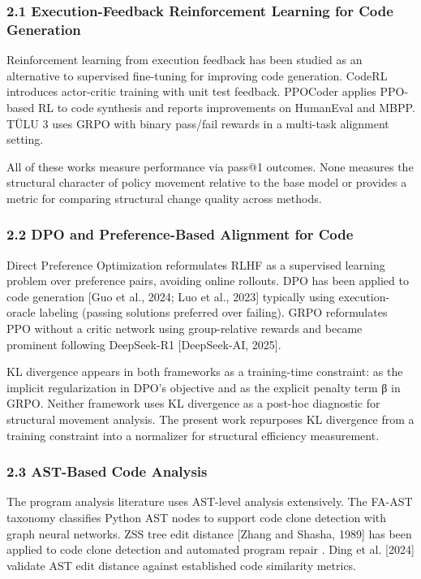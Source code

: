 
\subsubsection{2.1 Execution-Feedback Reinforcement Learning for Code Generation}

Reinforcement learning from execution feedback has been studied as an alternative to supervised fine-tuning for improving code generation. CodeRL \citep{Leetal2022} introduces actor-critic training with unit test feedback. PPOCoder \citep{Shojaeeetal2023} applies PPO-based RL to code synthesis and reports improvements on HumanEval and MBPP. TÜLU 3 \citep{Lambertetal2024} uses GRPO with binary pass/fail rewards in a multi-task alignment setting.

All of these works measure performance via pass@1 outcomes. None measures the structural character of policy movement relative to the base model or provides a metric for comparing structural change quality across methods.

\subsubsection{2.2 DPO and Preference-Based Alignment for Code}

Direct Preference Optimization \citep{Rafailovetal2023} reformulates RLHF as a supervised learning problem over preference pairs, avoiding online rollouts. DPO has been applied to code generation [Guo et al., 2024; Luo et al., 2023] typically using execution-oracle labeling (passing solutions preferred over failing). GRPO \citep{Shaoetal2024} reformulates PPO without a critic network using group-relative rewards and became prominent following DeepSeek-R1 [DeepSeek-AI, 2025].

KL divergence appears in both frameworks as a training-time constraint: as the implicit regularization in DPO's objective and as the explicit penalty term β in GRPO. Neither framework uses KL divergence as a post-hoc diagnostic for structural movement analysis. The present work repurposes KL divergence from a training constraint into a normalizer for structural efficiency measurement.

\subsubsection{2.3 AST-Based Code Analysis}

The program analysis literature uses AST-level analysis extensively. The FA-AST taxonomy \citep{Wangetal2020} classifies Python AST nodes to support code clone detection with graph neural networks. ZSS tree edit distance [Zhang and Shasha, 1989] has been applied to code clone detection \citep{Svajlenkoetal2014} and automated program repair \citep{Huaetal2018}. Ding et al. [2024] validate AST edit distance against established code similarity metrics.

